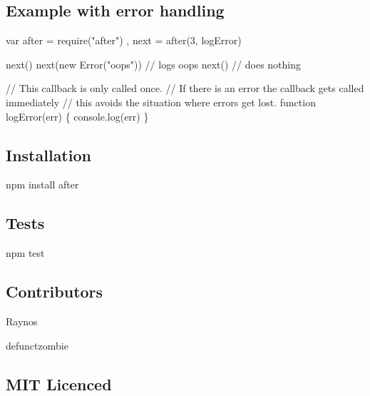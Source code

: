 \subsection*{Example with error handling}


\begin{DoxyCode}
var after = require("after")
    , next = after(3, logError)

next()
next(new Error("oops")) // logs oops
next() // does nothing

// This callback is only called once.
// If there is an error the callback gets called immediately
// this avoids the situation where errors get lost.
function logError(err) \{
    console.log(err)
\}
\end{DoxyCode}


\subsection*{Installation}

{\ttfamily npm install after}

\subsection*{Tests}

{\ttfamily npm test}

\subsection*{Contributors}


\begin{DoxyItemize}
\item Raynos
\item defunctzombie
\end{DoxyItemize}

\subsection*{M\+IT Licenced}